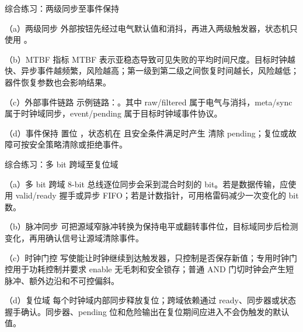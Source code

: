 \begin{chapteranswer}{综合练习：两级同步至事件保持}
\begin{answersubproblem}{（a）两级同步}
外部按钮先经过电气默认值和消抖，再进入两级触发器，状态机只使用 。
\end{answersubproblem}
\begin{answersubproblem}{（b）MTBF 指标}
MTBF 表示亚稳态导致可见失败的平均时间尺度。目标时钟越快、异步事件越频繁，风险越高；第一级到第二级之间恢复时间越长，风险越低；器件恢复参数也会影响结果。
\end{answersubproblem}
\begin{answersubproblem}{（c）外部事件链路}
示例链路：。其中 raw/filtered 属于电气与消抖，meta/sync 属于时钟域同步，event/pending 属于目标时钟域事件协议。
\end{answersubproblem}
\begin{answersubproblem}{（d）事件保持}
 置位 ，状态机在  且安全条件满足时产生  清除 pending；复位或故障可按安全策略清除或拒绝事件。
\end{answersubproblem}
\end{chapteranswer}

\begin{chapteranswer}{综合练习：多 bit 跨域至复位域}
\begin{answersubproblem}{（a）多 bit 跨域}
8-bit 总线逐位同步会采到混合时刻的 bit。若是数据传输，应使用 valid/ready 握手或异步 FIFO；若是计数指针，可用格雷码减少一次变化的 bit 数。
\end{answersubproblem}
\begin{answersubproblem}{（b）脉冲同步}
可把源域窄脉冲转换为保持电平或翻转事件位，目标域同步后检测变化，再用确认信号让源域清除事件。
\end{answersubproblem}
\begin{answersubproblem}{（c）时钟门控}
写使能让时钟继续到达触发器，只控制是否保存新值；专用时钟门控用于功耗控制并要求 enable 无毛刺和安全锁存；普通 AND 门切时钟会产生短脉冲、额外边沿和不可控偏斜。
\end{answersubproblem}
\begin{answersubproblem}{（d）复位域}
每个时钟域内部同步释放复位；跨域依赖通过 ready、同步器或状态握手确认。同步器、pending 位和危险输出在复位期间应进入不会伪触发的默认值。
\end{answersubproblem}
\end{chapteranswer}

